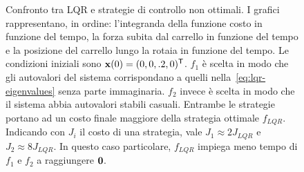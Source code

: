\begin{figure}
    \caption[Confronto tra LQR e controlli non ottimali]{
        Confronto tra LQR e strategie di controllo non ottimali.
        I grafici rappresentano, in ordine: l'integranda della funzione costo
        in funzione del tempo, la forza subita dal carrello in funzione del tempo
        e la posizione del carrello lungo la rotaia in funzione del tempo.
        Le condizioni iniziali sono $\mathbf{x}(0) = (0, 0, .2, 0)^{\mathsf{T}}$. 
        $f_1$ è scelta in modo che gli autovalori del sistema
        corrispondano a quelli nella~\eqref{eq:lqr-eigenvalues} senza parte
        immaginaria. $f_2$ invece è scelta in modo che il
        sistema abbia autovalori stabili casuali. Entrambe le
        strategie portano ad un costo finale maggiore della strategia
        ottimale $f_{LQR}$. Indicando con $J_i$ il costo di
        una strategia, vale $J_1 \approx 2J_{LQR}$ e $J_2 \approx 8J_{LQR}$.
        In questo caso particolare, $f_{LQR}$ impiega meno tempo di $f_1$ e $f_2$
        a raggiungere $\mathbf{0}$.
    }
    \label{fig:ottimalità}
\end{figure}

